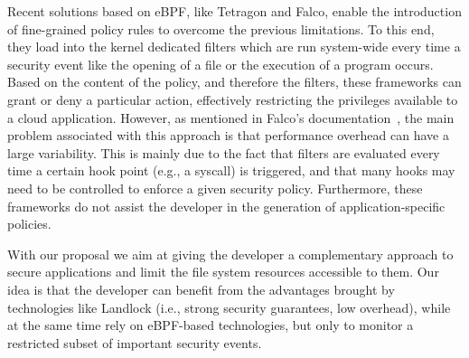Recent solutions based on eBPF, like Tetragon and Falco, enable the
introduction of fine-grained policy rules to overcome the previous
limitations. To this end, they load into the kernel dedicated filters
which are run system-wide every time a security event like the opening of a file
or the execution of a program occurs. Based on the content of the
policy, and therefore the filters, these frameworks can grant or deny
a particular action, effectively restricting the privileges available
to a cloud application. However, as mentioned in Falco's
documentation~\cite{falco-overhead}, the main problem associated with
this approach is that performance overhead can have a large
variability. This is mainly due to the fact that filters are evaluated
every time a certain hook point (e.g., a syscall) is triggered, and
that many hooks may need to be controlled to enforce a given security
policy. Furthermore, these frameworks do not assist the developer in
the generation of application-specific policies.

With our proposal we aim at giving the developer a complementary
approach to secure applications and limit the file system resources
accessible to them.  Our idea is that the developer can benefit from
the advantages brought by technologies like Landlock (i.e., strong
security guarantees, low overhead), while at the same time rely on
eBPF-based technologies, but only to monitor a restricted subset of
important security events.

